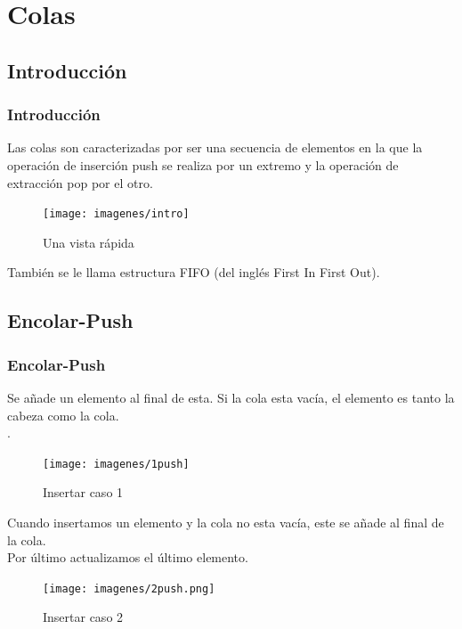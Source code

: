 \documentclass{beamer}
\begin{document}
\section {Colas}
\subsection{Introducción}

\begin{frame}
    \frametitle{Introducción}
    Las colas son caracterizadas por ser una secuencia de elementos en la que la operación de inserción push se realiza por un extremo y la operación de extracción pop por el otro.
    \begin{figure}
    \texttt{[image: imagenes/intro]}
    \caption{Una vista rápida}
    \end{figure}
       También se le llama estructura FIFO (del inglés First In First Out).
\end{frame}


 \subsection{Encolar-Push}
    \begin{frame}
      \frametitle{Encolar-Push}
      Se añade un elemento al final de esta. Si la cola esta vacía, el elemento es tanto la cabeza como la cola.\\
      .\\
      
      \begin{figure}
    \texttt{[image: imagenes/1push]}
    \caption{Insertar caso 1}
    \end{figure}
    \end{frame}
    
    \begin{frame}
	Cuando insertamos un elemento y la cola no esta vacía, este se añade al final de la cola.\\
	Por último actualizamos el último elemento.\\
    
    \begin{figure}
	\texttt{[image: imagenes/2push.png]}
      \caption{Insertar caso 2}
      \end{figure}
   
   \end{frame}
    
\end{document}
